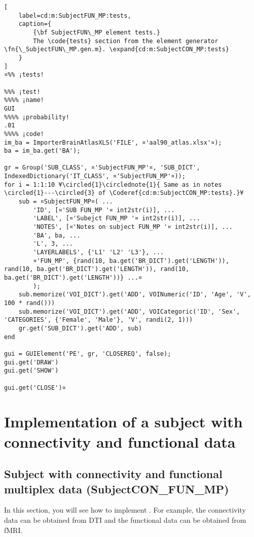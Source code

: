 \documentclass{tufte-handout}
\begin{document}
\begin{lstlisting}[
	label=cd:m:SubjectFUN_MP:tests,
	caption={
		{\bf SubjectFUN\_MP element tests.}
		The \code{tests} section from the element generator \fn{\_SubjectFUN\_MP.gen.m}. \expand{cd:m:SubjectCON_MP:tests}
	}
]
¤%% ¡tests!

%%% ¡test!
%%%% ¡name!
GUI
%%%% ¡probability!
.01
%%%% ¡code!
im_ba = ImporterBrainAtlasXLS('FILE', ¤'aal90_atlas.xlsx'¤);
ba = im_ba.get('BA');

gr = Group('SUB_CLASS', ¤'SubjectFUN_MP'¤, 'SUB_DICT', IndexedDictionary('IT_CLASS', ¤'SubjectFUN_MP'¤));
for i = 1:1:10 ¥\circled{1}\circlednote{1}{ Same as in notes \circled{1}---\circled{3} of \Coderef{cd:m:SubjectCON_MP:tests}.}¥
    sub = ¤SubjectFUN_MP¤( ...
        'ID', [¤'SUB FUN_MP '¤ int2str(i)], ...
        'LABEL', [¤'Subejct FUN_MP '¤ int2str(i)], ...
        'NOTES', [¤'Notes on subject FUN_MP '¤ int2str(i)], ...
        'BA', ba, ...
        'L', 3, ...
        'LAYERLABELS', {'L1' 'L2' 'L3'}, ...
        ¤'FUN_MP', {rand(10, ba.get('BR_DICT').get('LENGTH')), rand(10, ba.get('BR_DICT').get('LENGTH')), rand(10, ba.get('BR_DICT').get('LENGTH'))} ...¤
        );
    sub.memorize('VOI_DICT').get('ADD', VOINumeric('ID', 'Age', 'V', 100 * rand()))
    sub.memorize('VOI_DICT').get('ADD', VOICategoric('ID', 'Sex', 'CATEGORIES', {'Female', 'Male'}, 'V', randi(2, 1)))
    gr.get('SUB_DICT').get('ADD', sub)
end

gui = GUIElement('PE', gr, 'CLOSEREQ', false);
gui.get('DRAW')
gui.get('SHOW')

gui.get('CLOSE')¤
\end{lstlisting}

\clearpage

\section{Implementation of a subject with connectivity and functional data}

\subsection{Subject with connectivity and functional multiplex data (SubjectCON\_FUN\_MP)}

In this section, you will see how to implement . For example, the connectivity data can be obtained from DTI and the functional data can be obtained from fMRI.
\end{document}
